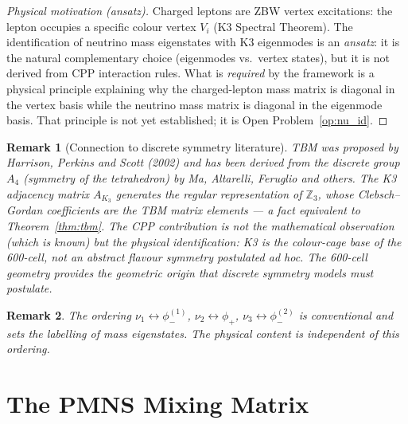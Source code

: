 \documentclass[11pt]{article}
\newtheorem{remark}{Remark}[section]
\begin{document}
\begin{proof}[Physical motivation (ansatz)]
Charged leptons are ZBW vertex excitations: the lepton occupies a
specific colour vertex $V_i$ (K3 Spectral Theorem). The identification
of neutrino mass eigenstates with K3 eigenmodes is an \emph{ansatz}:
it is the natural complementary choice (eigenmodes vs.\ vertex states),
but it is not derived from CPP interaction rules.
What is \emph{required} by the framework is a physical principle
explaining why the charged-lepton mass matrix is diagonal in the vertex
basis while the neutrino mass matrix is diagonal in the eigenmode basis.
That principle is not yet established; it is Open Problem~\ref{op:nu_id}.
\end{proof}
\begin{remark}[Connection to discrete symmetry literature]
TBM was proposed by Harrison, Perkins and Scott (2002) and has been
derived from the discrete group $A_4$ (symmetry of the tetrahedron)
by Ma, Altarelli, Feruglio and others.  The K3 adjacency matrix
$A_{K_3}$ generates the regular representation of $\mathbb{Z}_3$,
whose Clebsch--Gordan coefficients are the TBM matrix elements --- a
fact equivalent to Theorem~\ref{thm:tbm}.  The CPP contribution is
not the mathematical observation (which is known) but the
\emph{physical identification}: K3 is the colour-cage base of the
600-cell, not an abstract flavour symmetry postulated ad hoc.
The 600-cell geometry provides the geometric origin that discrete
symmetry models must postulate.
\end{remark}

\begin{remark}
The ordering $\nu_1 \leftrightarrow \phi_-^{(1)}$, $\nu_2 \leftrightarrow \phi_+$,
$\nu_3 \leftrightarrow \phi_-^{(2)}$ is conventional and sets the
labelling of mass eigenstates.  The physical content is independent
of this ordering.
\end{remark}

\section{The PMNS Mixing Matrix}
\end{document}
